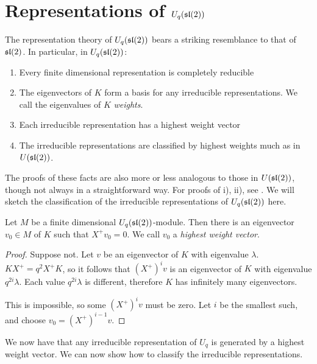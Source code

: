 \section{Representations of $U_q(\mathfrak{sl}(2))$}
\label{section:RepsOfUq}

The representation theory of $U_q(\mathfrak{sl}(2))$ bears a striking resemblance to
that of $\mathfrak{sl}(2)$. In particular, in $U_q(\mathfrak{sl}(2))$:

\begin{enumerate}
    \renewcommand{\labelenumi}{\roman{enumi})}
    \item Every finite dimensional representation is completely reducible
    \item The eigenvectors of $K$ form a basis for any irreducible representations. We call the eigenvalues of $K$ \emph{weights}.
    \item Each irreducible representation has a highest weight vector
    \item The irreducible representations are classified by highest weights much as in $U(\mathfrak{sl}(2))$.
\end{enumerate}

The proofs of these facts are also more or less analogous to those in
$U(\mathfrak{sl}(2))$, though not always in a straightforward way. For proofs of i),
ii), see \cite{Kassel1994}. We will sketch the classification of the
irreducible representations of $U_q(\mathfrak{sl}(2))$ here.

\begin{claim}
\label{claim:HighestWeight}
    Let $M$ be a finite dimensional $U_q(\mathfrak{sl}(2))$-module. Then there is an
    eigenvector $v_0 \in M$ of $K$ such that $ X^+ v_0 = 0$. We call $v_0$ a
    \emph{highest weight vector}.
\end{claim}

\begin{proof}

    Suppose not. Let $v$ be an eigenvector of $K$ with eigenvalue $\lambda$.
    $K X^+ = q^2  X^+ K$, so it follows that $(X^+)^i v$ is an
    eigenvector of $K$ with eigenvalue $q^{2i}\lambda$. Each value
    $q^{2i}\lambda$ is different, therefore $K$ has infinitely many
    eigenvectors. 

    This is impossible, so some $(X^+)^i v$ must be zero. Let $i$ be the
    smallest such, and choose $v_0 = (X^+)^{i-1} v$.
\end{proof}

We now have that any irreducible representation of $U_q$ is generated by a
highest weight vector. We can now show how to classify the irreducible
representations. 


